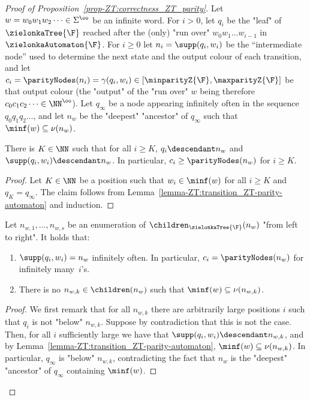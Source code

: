 \documentclass[10pt,a4paper]{amsart}
\newenvironment{subproof}[1][Proof]{\begin{proof}[#1]\renewcommand{\qedsymbol}{$\blacksquare$}}{\end{proof}}
\renewcommand{\gg}{\gamma}
\renewcommand{\SS}{\Sigma}
\begin{document}
\begin{proof}[Proof of Proposition~\ref{prop-ZT:correctness_ZT_parity}]
	Let $w = w_0w_1w_2\dots \in \SS^\oo$ be an infinite word. For $i>0$, let 
	 $q_i$ be the "leaf" of $\zielonkaTree{\F}$ reached after the (only) "run over" $w_0w_1\dots w_{i-1}$ in $\zielonkaAutomaton{\F}$. 
	For $i\geq 0$ let $n_i = \supp(q_i,w_i)$ be the ``intermediate node'' used to determine the next state and the output colour of each transition, and let $c_i = \parityNodes(n_i) = \gg(q_i, w_i) \in [\minparityZ{\F}, \maxparityZ{\F}]$ be that output colour (the "output" of the "run over" $w$ being therefore $c_0c_1c_2\dots \in \NN^\oo$). 
	Let $q_\infty$ be a node appearing infinitely often in the sequence $q_0q_1q_2\dots$, and let $n_w$ be the "deepest" "ancestor" of $q_\infty$ such that $\minf(w)\subseteq \nu(n_w)$.
	\begin{claim}\label{claim:supp-below-n-CORRECT-ZT}
		 There is $K\in \NN$ such that for all $i \geq K$, $q_i \descendant n_w$ and $\supp(q_i, w_i) \descendant n_w$. In particular, $c_i \geq \parityNodes(n_w)$ for $i\geq K$.
	\end{claim}
	\begin{subproof}
		Let $K\in \NN$ be a position such that $w_i \in \minf(w)$ for all $i\geq K$ and $q_K = q_\infty$.
		The claim follows from Lemma~\ref{lemma-ZT:transition_ZT-parity-automaton} and induction.
	\end{subproof}
	\begin{claim}\label{claim:supp-n_inf_often-CORRECT-ZT}
		Let $n_{w,1},\dots, n_{w,s}$ be an enumeration of $\children_{\zielonkaTree{\F}}(n_w)$ "from left to right". It holds that:
		\begin{enumerate}
			\item $\supp(q_i,w_i) = n_w$ infinitely often. In particular, $c_i = \parityNodes(n_w)$ for infinitely many~$i$'s.
			\item There is no $n_{w,k}\in \children(n_w)$ such that $\minf(w) \subseteq \nu(n_{w,k})$.
		\end{enumerate}	
	\end{claim}
	\begin{subproof}
		We first remark that for all $n_{w,k}$ there are arbitrarily large positions $i$ such that $q_i$ is not "below" $n_{w,k}$. Suppose by contradiction that this is not the case. Then, for all $i$ sufficiently large we have that $\supp(q_i, w_i) \descendant n_{w,k}$, and by Lemma~\ref{lemma-ZT:transition_ZT-parity-automaton}, $\minf(w)\subseteq \nu(n_{w,k})$. In particular, $q_\infty$ is "below" $n_{w,k}$, contradicting the fact that $n_w$ is the "deepest" "ancestor" of $q_\infty$ containing $\minf(w)$.
		

\end{subproof}
\end{proof}
\end{document}
